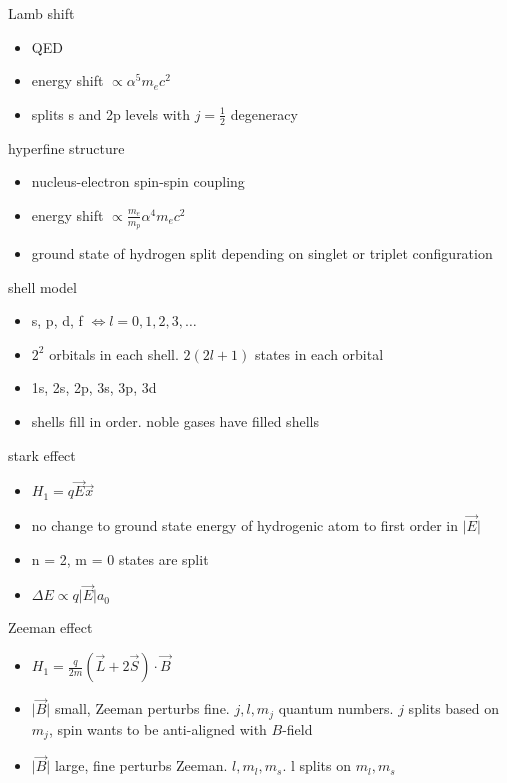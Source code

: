 \documentclass[avery5388, frame]{flashcards}
\begin{document}
\begin{flashcard}{Lamb shift}
  {
    \begin{itemize}
    \item QED
    \item energy shift $\propto \alpha^{5} m_{e} c^{2}$
    \item splits s and 2p levels with $j = \frac{1}{2}$ degeneracy
    \end{itemize}
  }
\end{flashcard}

\begin{flashcard}{hyperfine structure}
  {
    \begin{itemize}
    \item nucleus-electron spin-spin coupling
    \item energy shift $\propto \frac{m_{e}}{m_{p}} \alpha^{4} m_{e} c^{2}$
      \item ground state of hydrogen split depending on singlet or triplet configuration
    \end{itemize}
  }
\end{flashcard}

\begin{flashcard}{shell model}
  {
    \begin{itemize}
    \item s, p, d, f $\iff l = 0, 1, 2, 3, \dots$
    \item $2^{2}$ orbitals in each shell. $2(2l + 1)$ states in each orbital
    \item 1s, 2s, 2p, 3s, 3p, 3d
    \item shells fill in order. noble gases have filled shells
    \end{itemize}
  }
\end{flashcard}

\begin{flashcard}{stark effect}
  {
    \begin{itemize}
    \item $H_{1} = q \vec{E} \vec{x}$
    \item no change to ground state energy of hydrogenic atom to first order in $\lvert \vec{E} \rvert$
    \item n = 2, m = 0 states are split
    \item $\Delta E \propto q \lvert \vec{E} \rvert a_{0}$
    \end{itemize}
  }
\end{flashcard}

\begin{flashcard}{Zeeman effect}
  {
    \begin{itemize}
    \item $H_{1} = \frac{q}{2m} (\vec{L} + 2\vec{S}) \cdot \vec{B}$
    \item $\lvert \vec{B} \rvert$ small, Zeeman perturbs fine. $j, l, m_{j}$ quantum numbers. $j$ splits based on $m_{j}$, spin wants to be anti-aligned with $B$-field
      \item $\lvert \vec{B} \rvert$ large, fine perturbs Zeeman. $l, m_{l}, m_{s}$. l splits on $m_{l}, m_{s}$
    \end{itemize}
  }
\end{flashcard}
\end{document}
